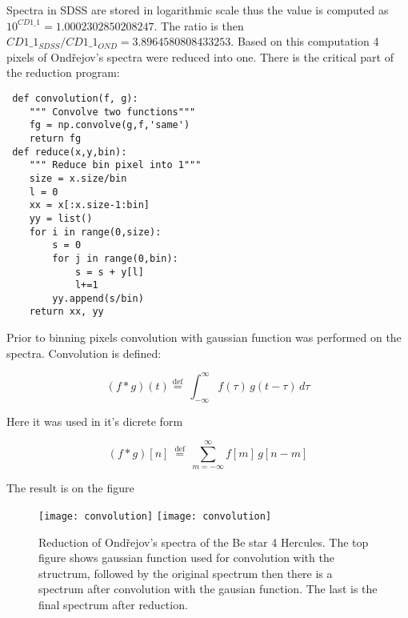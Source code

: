 Spectra in SDSS are stored in logarithmic scale thus the value is
computed as $ 10^{CD1\_1} = 1.0002302850208247$. The ratio is then
$CD1\_1_{SDSS}/CD1\_1_{OND} = 3.8964580808433253$. Based on this
computation 4 pixels of Ondřejov's spectra were reduced into
one. There is the critical part of the reduction program:

\begin{lstlisting}
 def convolution(f, g):
    """ Convolve two functions"""
    fg = np.convolve(g,f,'same')
    return fg
 def reduce(x,y,bin):
    """ Reduce bin pixel into 1"""
    size = x.size/bin
    l = 0
    xx = x[:x.size-1:bin]
    yy = list()
    for i in range(0,size):
        s = 0
        for j in range(0,bin):
            s = s + y[l]
            l+=1
        yy.append(s/bin)
    return xx, yy
\end{lstlisting}

Prior to binning pixels convolution with gaussian function was
performed on the spectra. Convolution is defined:

\begin{equation}
  \label{eq:convolution}
 (f * g )(t) \stackrel{\mathrm{def}}{=}\ \int_{-\infty}^{\infty} f(\tau)\, g(t - \tau)\, d\tau
\end{equation}
 
Here it was used in it's dicrete form

\begin{equation}
  \label{eq:discreteConvolution}
  (f * g)[n]\ \stackrel{\mathrm{def}}{=}\ \sum_{m=-\infty}^{\infty} f[m]\, g[n - m]
\end{equation}



The result is on the figure


    \begin{figure}[!htbp]
      \begin{center}
        \leavevmode
        \ifpdf
        \texttt{[image: convolution]}
        \else
        \texttt{[image: convolution]}
        \fi
        \caption{Reduction of Ondřejov's spectra of the Be star 4
          Hercules. The top figure shows gaussian function used for
          convolution with the structrum, followed by the original
          spectrum then there is a spectrum after convolution with the
          gausian function. The last is the final spectrum after
          reduction.}
        \label{FigReduction}
      \end{center}
    \end{figure}

